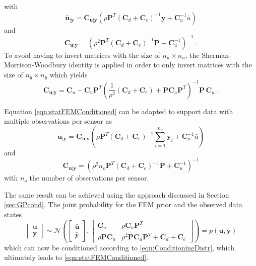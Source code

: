 \documentclass[%
  a4paper,oneside,%
  11pt,%
  smallchapters,
  style=printdev,
  extramargin,
  green,%
  rgb, <cmyk>
  ]{tubsbook}
\begin{document}
%
with
%
\begin{equation}
\bm{\bar{u}}_{|\bm{y}} = \bm{C}_{\bm{u}|\bm{y}} \left(   \rho \bm{P}^T  (\bm{C}_d + \bm{C}_e)^{-1}  \bm{y}  +  \bm{C}_u^{-1}  \bar{u}   \right)
\end{equation}
and
\begin{equation}
\bm{C}_{\bm{u}|\bm{y}} = \left(      \rho^2  \bm{P}^T   (\bm{C}_d + \bm{C}_e)^{-1}  \bm{P}  +  \bm{C}_u^{-1}    \right)^{-1} \;.
\end{equation}
To avoid having to invert matrices with the size of $n_u \times n_u$, the Sherman-Morrison-Woodbury identity \cite{riedel1992} is applied \cite{girolami2021} in order to only invert matrices with the size of $n_y \times n_y$ which yields
\begin{equation}
\bm{C}_{\bm{u}|\bm{y}} = \bm{C}_u - \bm{C}_u \bm{P}^T (\frac{1}{\rho^2} (\bm{C}_d + \bm{C}_e) + \bm{P} \bm{C}_u \bm{P}^T)^{-1} \bm{P}\,\bm{C}_u \;.
\end{equation}

Equation \eqref{eqn:statFEMConditioned} can be adapted to support data with multiple observations per sensor as
\begin{equation}
\bm{\bar{u}}_{|\bm{y}} = \bm{C}_{\bm{u}|\bm{y}} \left(   \rho \bm{P}^T  (\bm{C}_d + \bm{C}_e)^{-1}  \sum_{i=1}^{n_o}\bm{y}_i  +  \bm{C}_u^{-1}  \bar{u}   \right)
\end{equation}
and
\begin{equation}
\bm{C}_{\bm{u}|\bm{y}} = \left(      \rho^2 n_o \bm{P}^T   (\bm{C}_d + \bm{C}_e)^{-1}  \bm{P}  +  \bm{C}_u^{-1}    \right)^{-1} 
\end{equation}
with $n_o$ the number of observations per sensor.


The same result can be achieved using the approach discussed in Section \ref{sec:GPcond}. The joint probability for the FEM prior and the observed data states
\begin{equation}
\begin{bmatrix}
           \bm{u}\\
          \bm{y}
         \end{bmatrix} \sim \mathcal{N}\left( \begin{bmatrix}
           \bar{\bm{u}}  \\
           \bar{\bm{y}}
         \end{bmatrix}, \begin{bmatrix}
\bm{C}_u & \rho \bm{C}_u \bm{P}^T \\
\rho \bm{P} \bm{C}_u  & \rho^2 \bm{P} \bm{C}_u \bm{P}^T + \bm{C}_d + \bm{C}_e 
\end{bmatrix}  \right) = p(\bm{u},\bm{y})
\end{equation}
which can now be conditioned according to \eqref{eqn:ConditioningDistr}, which ultimately leads to \eqref{eqn:statFEMConditioned}.
\end{document}
